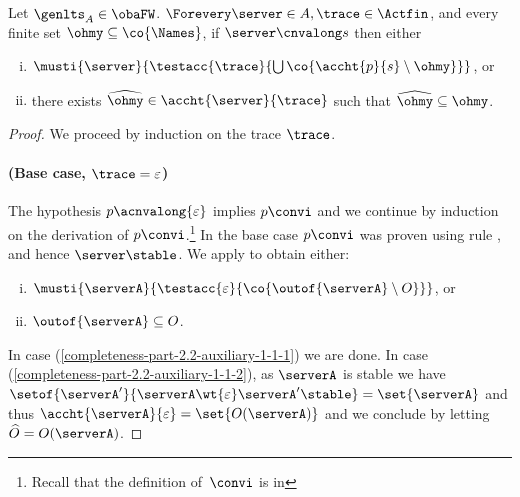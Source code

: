 {\noindent%
\textbf{} 
 Let $\genlts_A \in \obaFW$.
  $\Forevery \server \in \States, \trace \in \Actfin$,
  and every finite set $\ohmy \subseteq \co{\Names}$,
  if $\server \cnvalong s$ then either
  \begin{enumerate}[(i)]
      \item
    $\musti{\server}{\testacc{ \trace }{ \bigcup \co{ \accht{p}{s}
          \setminus \ohmy }}}$, or
  \item
    there exists $\widehat{\ohmy} \in \accht{ \server }{ \trace }$ such that $\widehat{\ohmy} \subseteq \ohmy$.
  \end{enumerate}
\begin{proof}
  We proceed by induction on the trace $\trace$.


  \paragraph{(Base case, $\trace = \varepsilon$)}
  The hypothesis $p \acnvalong{\varepsilon}$ implies $p \convi$ and we continue by induction
  on the derivation of $p \convi$.\footnote{Recall that the definition of~$\convi$ is in }
  In the base case $p \convi$ was proven using rule \mnow, and hence $\server  \stable$.
  We apply 
  to obtain either:
  \begin{enumerate}[(i)]
  \item\label{completeness-part-2.2-auxiliary-1-1-1}
    $\musti{\serverA}{\testacc{\varepsilon}{ \co{ \outof{\serverA} \setminus O}} }$, or
  \item\label{completeness-part-2.2-auxiliary-1-1-2}
    $\outof{\serverA} \subseteq O$.
  \end{enumerate}
  In case (\ref{completeness-part-2.2-auxiliary-1-1-1}) we are done.
  In case (\ref{completeness-part-2.2-auxiliary-1-1-2}), as $\serverA$ is stable we have
  $\setof{\serverA'}{\serverA \wt{\varepsilon} \serverA' \stable} = \set{\serverA}$ and thus
  $\accht{\serverA}{\varepsilon} = \set{O(\serverA)}$ and we conclude by letting
  $\widehat{O} = O(\serverA)$.



\end{proof}}
